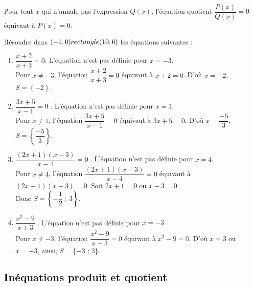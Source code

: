 \begin{Propriété}
Pour tout $x$ qui n'annule pas l'expression $Q(x)$, l'équation-quotient $\dfrac{P(x)}{Q(x)}= 0$ équivaut à $P(x) = 0$.

\end{Propriété}

\begin{Exemple}
Résoudre dans $(-1,0) rectangle (10,6)$ les équations suivantes :
\begin{enumerate}
\item $\dfrac{x+2}{x+3} = 0 $. L'équation n'est pas définie pour $x = -3$.\\Pour $x\neq -3$, l'équation $\dfrac{x+2}{x+3} = 0 $ équivaut à $x+2=0$. D'où $x=-2$, $S=\left\{-2\right\}$.
~\\
\item $\dfrac{3x+5}{x-1}=0$ .
L'équation n'est pas définie pour $x = 1$.\\
Pour $x\neq 1$, l'équation $\dfrac{3x+5}{x-1} = 0 $ équivaut à $3x+5=0$. D'où $x=\dfrac{-5}{3}$, $S=\left\{\dfrac{-5}{3}\right\}$.
~\\
\item $\dfrac{(2x+1)(x-3)}{x-4}=0$ .
L'équation n'est pas définie pour $x = 4$. \\
Pour $x\neq 4$, l'équation $\dfrac{(2x+1)(x-3)}{x-4} = 0 $ équivaut à $(2x+1)(x-3)=0$. Soit $2x+1=0$ ou $x-3=0$.\\
Donc $S=\left\{-\dfrac{1}{2} \text{ ; } 3\right\}$.
~\\
\item $\dfrac{x^2-9}{x+3}$ .
L'équation n'est pas définie pour $x = -3$.\\
Pour $x\neq -3$, l'équation $\dfrac{x^2-9}{x+3} = 0 $ équivaut à $x^2-9=0$. D'où $x=3$ ou $x=-3$, ainsi, $S=\{-3\text{ ; } 3\}$.
\end{enumerate}

\end{Exemple}
\newpage
\subsection{Inéquations produit et quotient}

